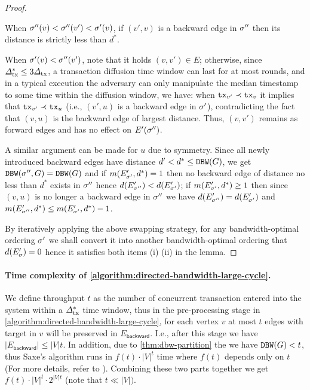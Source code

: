 \begin{proof}
\begin{cccItemize}[nosep]
        \item When $\sigma''(v) < \sigma''(v') < \sigma'(v)$, if $(v', v)$ is a backward edge in $\sigma''$ then its distance is strictly less than $d^*$.

        \item When $\sigma'(v) < \sigma''(v')$, note that it holds $(v, v') \in E$; otherwise, since $\varDelta_{\mathrm{tx}}^* \le 3\varDelta_{\mathrm{tx}}$, a transaction diffusion time window can last for at most \txDelay rounds, and in a typical execution the adversary can only manipulate the median timestamp to some time within the diffusion window, we have: when $\mathtt{tx}_{v'} \prec \mathtt{tx}_{v}$ it implies that $\mathtt{tx}_{v'} \prec \mathtt{tx}_{u}$ (i.e., $(v', u)$ is a backward edge in $\sigma'$), contradicting the fact that $(v, u)$ is the backward edge of largest distance.
        Thus, $(v, v')$ remains as forward edges and has no effect on $E'(\sigma'')$.
    \end{cccItemize}

    A similar argument can be made for $u$ due to symmetry.
    Since all newly introduced backward edges have distance $d' < d^* \le \mathtt{DBW}(G)$, we get $\mathtt{DBW}(\sigma'', G) = \mathtt{DBW}(G)$ and if $m(E'_{\sigma'}, d^*) = 1$ then no backward edge of distance no less than $d^*$ exists in $\sigma''$ hence $d(E'_{\sigma''}) < d(E'_{\sigma'})$;
    if $m(E'_{\sigma'}, d^*) \ge 1$ then since $(v, u)$ is no longer a backward edge in $\sigma''$ we have $d(E'_{\sigma''}) = d(E'_{\sigma'})$ and $m(E'_{\sigma''}, d^*) \le m(E'_{\sigma'}, d^*) - 1$.

    By iteratively applying the above swapping strategy, for any bandwidth-optimal ordering $\sigma'$ we shall convert it into another bandwidth-optimal ordering \orderOutput that $d(E'_\sigma) = 0$ hence it satisfies both items (i) (ii) in the lemma.
\end{proof}

\paragraph{Time complexity of \cref*{algorithm:directed-bandwidth-large-cycle}.}
%
We define throughput $t$ as the number of concurrent transaction entered into the system within a $\varDelta_{\mathrm{tx}}^*$ time window, thus in the pre-processing stage in \cref{algorithm:directed-bandwidth-large-cycle}, for each vertex $v$ at most $t$ edges with target in $v$ will be preserved in $E_{\mathsf{backward}}$.
%
I.e., after this stage we have $|E_{\mathsf{backward}}| \le |V|t$.
%
In addition, due to \cref{thm:dbw-partition} the we have $\mathtt{DBW}(G) < t$, thus Saxe's algorithm runs in $f(t) \cdot |V|^t$ time where $f(t)$ depends only on $t$ (For more details, refer to \cite{SIAMMAX:Saxe80}).
%
Combining these two parts together we get $f(t) \cdot |V|^t \cdot 2^{|V|t}$ (note that $t \ll |V|)$.

